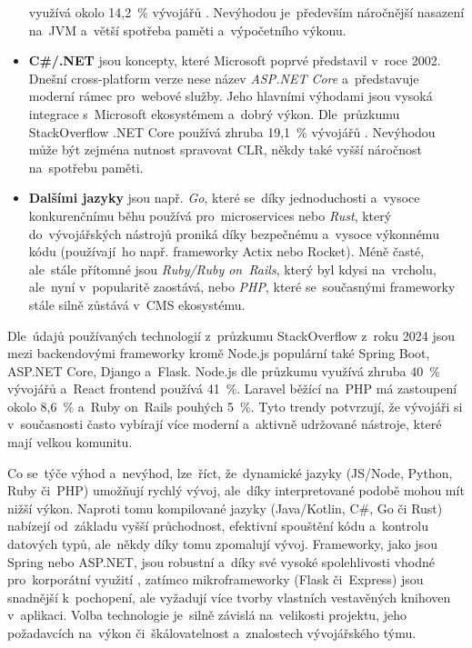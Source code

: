 \begin{itemize}
        využívá okolo 14,2~\% vývojářů
        \cite{YHVfLHsNlUItkF6G,w6F4OYb0neliWLGP}. %
        Nevýhodou je~především náročnější nasazení na~JVM a~větší spotřeba
        paměti a~výpočetního výkonu.
    \item \textbf{C\#/.NET} jsou koncepty, které Microsoft poprvé
        představil v~roce 2002. Dnešní cross-platform verze nese název
        \emph{ASP.NET Core} a~představuje moderní rámec pro~webové služby.
        Jeho hlavními výhodami jsou vysoká integrace s~Microsoft ekosystémem
        a~dobrý výkon. Dle~průzkumu StackOverflow .NET Core používá
        zhruba 19,1~\% vývojářů
        \cite{YHVfLHsNlUItkF6G,w6F4OYb0neliWLGP}. %
        Nevýhodou může být zejména nutnost spravovat CLR, někdy také
        vyšší náročnost na~spotřebu paměti.
    \item \textbf{Dalšími jazyky} jsou např. \emph{Go}, které se~díky
        jednoduchosti a~vysoce konkurenčnímu běhu používá pro~microservices
        nebo \emph{Rust}, který do~vývojářských nástrojů proniká díky
        bezpečnému a~vysoce výkonnému kódu (používají~ho např. frameworky
        Actix nebo Rocket). Méně časté, ale~stále přítomné jsou
        \emph{Ruby/Ruby on~Rails}, který byl kdysi na~vrcholu, ale~nyní
        v~popularitě zaostává, nebo \emph{PHP}, které se~současnými
        frameworky stále silně zůstává v~CMS ekosystému.
\end{itemize}

Dle~údajů používaných technologií z~průzkumu StackOverflow z~roku 2024
jsou mezi backendovými frameworky kromě Node.js populární také Spring
Boot, ASP.NET Core, Django a~Flask. Node.js dle průzkumu využívá zhruba
40~\% vývojářů a~React frontend používá 41~\%. Laravel běžící na~PHP
má zastoupení okolo 8,6~\% a~Ruby on~Rails pouhých 5~\%. Tyto trendy
potvrzují, že vývojáři si v~současnosti často vybírají více moderní
a~aktivně udržované nástroje, které mají velkou komunitu.
\cite{YHVfLHsNlUItkF6G,w6F4OYb0neliWLGP} %

Co se~týče výhod a~nevýhod, lze~říct, že~dynamické jazyky (JS/Node,
Python, Ruby či~PHP) umožňují rychlý vývoj, ale~díky interpretované
podobě mohou mít nižší výkon. Naproti tomu kompilované jazyky
(Java/Kotlin, C\#, Go či Rust) nabízejí od~základu vyšší průchodnost,
efektivní spouštění kódu a~kontrolu datových typů, ale~někdy díky
tomu zpomalují vývoj. Frameworky, jako jsou Spring nebo ASP.NET,
jsou robustní a~díky své vysoké spolehlivosti vhodné pro~korporátní
využití \cite{YHVfLHsNlUItkF6G,w6F4OYb0neliWLGP}, %
zatímco mikroframeworky (Flask či~Express) jsou snadnější k~pochopení,
ale vyžadují více tvorby vlastních vestavěných knihoven v~aplikaci.
Volba technologie je~silně závislá na~velikosti projektu, jeho
požadavcích na~výkon či~škálovatelnost a~znalostech vývojářského
týmu.

